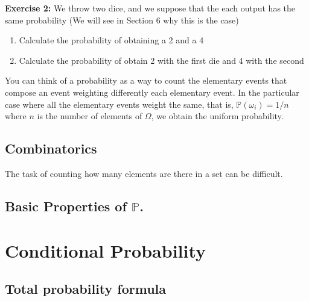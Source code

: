 \documentclass[reqno]{amsart}
\newcommand{\<}{{\langle \!\! \langle}}
\renewcommand{\>}{{\rangle \!\! \rangle}}
\newcommand{\commento}[1]{
	\par\noindent
	\colorbox{light}{\begin{minipage}{120 mm}#1\end{minipage}}
	\par\noindent
}
\begin{document}
\textbf{Exercise 2:}
We throw two dice, and we suppose that the each output has the same probability (We will see in Section 6 why this is the case)
\begin{enumerate} 
    
    \item Calculate the probability of obtaining a 2 and a 4\\
    
    \item Calculate the probability of obtain 2 with the first die and 4 with the second 
\end{enumerate}

\commento{ You can think of a probability as a way to count the elementary events that compose an event weighting differently each elementary event. In the particular case where  all the elementary events weight the same, that is, $\mathbb{P}(\omega_i)=1/n$ where $n$ is the number of elements of $\Omega$, we obtain the uniform probability.}

\subsection{Combinatorics}
The task of counting how many elements are there in a set can be difficult. 

\subsection{Basic Properties of $\mathbb{P}$. }


\section{Conditional Probability }


\subsection{Total probability formula}
\end{document}

